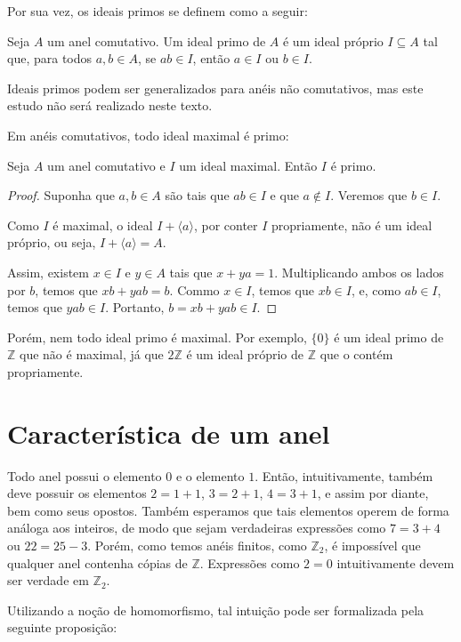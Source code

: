 Por sua vez, os ideais primos se definem como a seguir:

\begin{definition}
    Seja $A$ um anel comutativo.
    Um ideal primo de $A$ é um ideal próprio $I\subseteq A$ tal que, para todos $a, b \in A$, se $ab \in I$, então $a \in I$ ou $b \in I$.
\end{definition}

Ideais primos podem ser generalizados para anéis não comutativos, mas este estudo não será realizado neste texto.

Em anéis comutativos, todo ideal maximal é primo:

\begin{prop}
Seja $A$ um anel comutativo e $I$ um ideal maximal.
Então $I$ é primo.
\end{prop}

\begin{proof}
    Suponha que $a, b \in A$ são tais que $ab \in I$ e que $a \notin I$.
    Veremos que $b \in I$.

    Como $I$ é maximal, o ideal $I+\langle a\rangle$, por conter $I$ propriamente, não é um ideal próprio, ou seja, $I+\langle a\rangle=A$.

    Assim, existem $x \in I$ e $y \in A$ tais que $x+ya=1$.
    Multiplicando ambos os lados por $b$, temos que $xb+yab=b$.
    Commo $x \in I$, temos que $xb \in I$, e, como $ab \in I$, temos que $yab \in I$.
    Portanto, $b=xb+yab\in I$.
\end{proof}

Porém, nem todo ideal primo é maximal. Por exemplo, $\{0\}$ é um ideal primo de $\mathbb Z$ que não é maximal, já que $2\mathbb Z$ é um ideal próprio de $\mathbb Z$ que o contém propriamente.

\section{Característica de um anel}
Todo anel possui o elemento $0$ e o elemento $1$.
Então, intuitivamente, também deve possuir os elementos $2=1+1$, $3=2+1$, $4=3+1$, e assim por diante, bem como seus opostos.
Também esperamos que tais elementos operem de forma análoga aos inteiros, de modo que sejam verdadeiras expressões como $7=3+4$ ou $22=25-3$.
Porém, como temos anéis finitos, como $\mathbb Z_2$, é impossível que qualquer anel contenha cópias de $\mathbb Z$.
Expressões como $2=0$ intuitivamente devem ser verdade em $\mathbb Z_2$.

Utilizando a noção de homomorfismo, tal intuição pode ser formalizada pela seguinte proposição:

